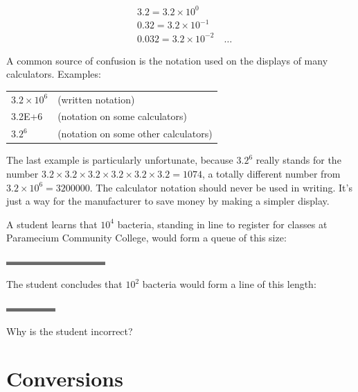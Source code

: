 \begin{align*}
&3.2 =  3.2 \times 10^0\\
&0.32 = 3.2 \times 10^{-1}\\
&0.032 = 3.2 \times 10^{-2} \quad\ldots
\end{align*}

A common source of confusion is the notation used on the
displays of many calculators. Examples:

\vspace{8mm}

\hspace{10mm}\begin{tabular}{ll}
$3.2 \times 10^6$  &     (written notation)\\
3.2E+6             &     (notation on some calculators)\\
$3.2^6$            &     (notation on some other calculators)
\end{tabular}

\vspace{8mm}

\noindent The last example is particularly unfortunate, because
$3.2^6$ really stands for the number 
$3.2 \times 3.2 \times 3.2 \times 3.2 \times 3.2 \times 3.2= 1074$, a totally different number from $3.2 \times 10^6=3200000$.
The calculator notation should never be used in writing.
It's just a way for the manufacturer to save money by
making a simpler display.

\begin{exmp}
A student learns that $10^4$  bacteria, standing in line to
register for classes at Paramecium Community College, would
form a queue of this size:

\includegraphics{./introduction/figs/sc-bacteria-queue-1}

\noindent The student concludes that $10^2$  bacteria would form a line of this length:

\includegraphics{./introduction/figs/sc-bacteria-queue-2}

\noindent Why is the student incorrect?
\end{exmp}
\divider
\vspace{2mm}

\section{Conversions}\label{sec:conversions}

